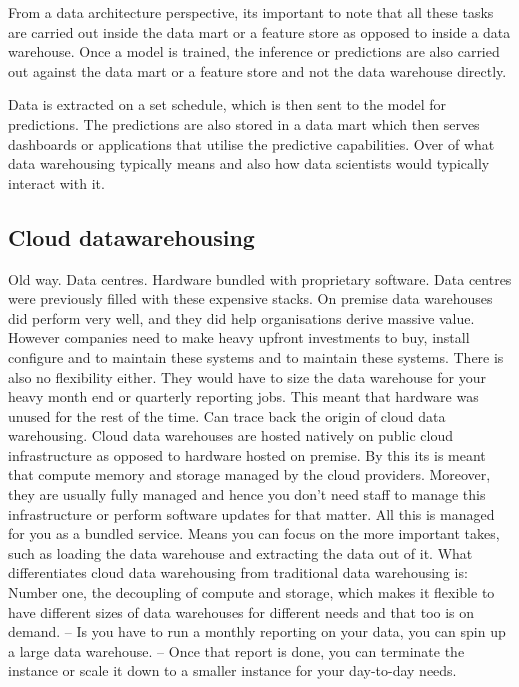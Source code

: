 \documentclass[a4paper, 11pt]{article}
\begin{document}
    From a data architecture perspective, its important to note that all these tasks are carried out inside the data mart or a feature store as opposed to inside a data warehouse.
    Once a model is trained, the inference or predictions are also carried out against the data mart or a feature store and not the data warehouse directly.

    Data is extracted on a set schedule, which is then sent to the model for predictions.
    The predictions are also stored in a data mart which then serves dashboards or applications that utilise the predictive capabilities.
    Over of what data warehousing typically means and also how data scientists would typically interact with it.

    \subsection{Cloud datawarehousing}

    Old way. Data centres. Hardware bundled with proprietary software.
    Data centres were previously filled with these expensive stacks.
    On premise data warehouses did perform very well, and they did help organisations derive massive value.
    However companies need to make heavy upfront investments to buy, install configure and to maintain these systems and to maintain these systems.
    There is also no flexibility either.
    They would have to size the data warehouse for your heavy month end or quarterly reporting jobs.
    This meant that hardware was unused for the rest of the time.
    Can trace back the origin of cloud data warehousing.
    Cloud data warehouses are hosted natively on public cloud infrastructure as opposed to hardware hosted on premise.
    By this its is meant that compute memory and storage managed by the cloud providers.
    Moreover, they are usually fully managed and hence you don't need staff to manage this infrastructure or perform software updates for that matter.
    All this is managed for you as a bundled service.
    Means you can focus on the more important takes, such as loading the data warehouse and extracting the data out of it.
    What differentiates cloud data warehousing from traditional data warehousing is:
    Number one, the decoupling of compute and storage, which makes it flexible to have different sizes of data warehouses for different needs and that too is on demand.
    -- Is you have to run a monthly reporting on your data, you can spin up a large data warehouse.
    -- Once that report is done, you can terminate the instance or scale it down to a smaller instance for your day-to-day needs.
\end{document}
